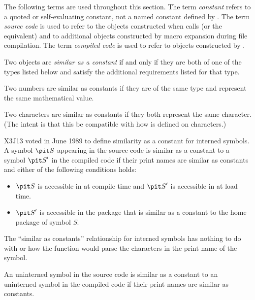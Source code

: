\begin{newer}
The following terms are used throughout this section.
  The term {\it constant} refers to a quoted or self-evaluating constant,
  not a named constant defined by .
  The term {\it source code} is used to refer to the objects constructed
  when  calls  (or the equivalent) and to
  additional objects constructed by
  macro expansion during file compilation.
  The term {\it compiled code} is used to refer to objects constructed by 
  .

Two objects are {\it similar as a constant} if and only if
they are both of one of the types listed below and satisfy the
additional requirements listed for that type.

\begin{flushdesc}
\item[\cdf{number}]

  Two numbers are similar as constants if they are of the same type
  and represent the same mathematical value.
  
\item[\cdf{character}]

  Two characters are similar as constants if they both represent
  the same character.  (The intent is that this be compatible with
  how  is defined on characters.)

\item[\cdf{symbol}]
  X3J13 voted in June 1989 
  to define similarity as a constant for interned symbols.
  A symbol ${\it S}$ appearing in the source code is similar as a constant to 
  a symbol ${\it S}'$ in the compiled code if their print names are similar as constants
   and either of the following conditions holds:
\begin{itemize}
\item  ${\it S}$ is accessible in  at compile time and ${\it S}'$ is accessible in
        at load time.
\item  ${\it S}'$ is accessible in the package that is similar as a constant to the
       home package of symbol {\it S}.
\end{itemize}
  The ``similar as constants'' relationship for interned symbols has nothing
  to do with  or how the function  would parse the 
  characters in the print name of the symbol.

  An uninterned symbol in the source code is similar as a constant
  to an uninterned symbol in the compiled code if their print names
  are similar as constants.


\end{flushdesc}
\end{newer}
